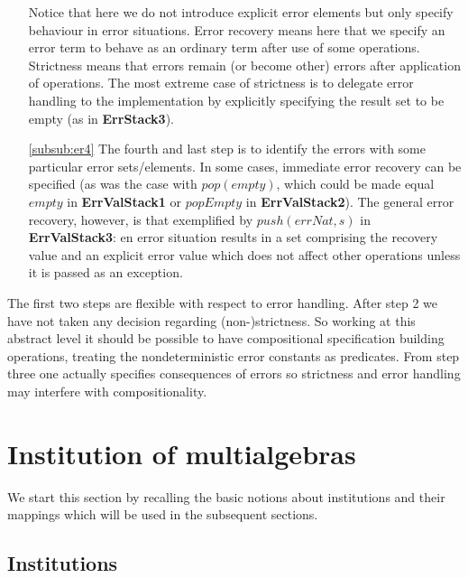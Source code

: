 \documentclass[10pt]{article}
\begin{document}
\begin{enumerate}
	Notice that here we do not introduce explicit error elements but only
	specify behaviour in error situations. Error recovery means here that we specify an error term to
	behave as an ordinary term after use of some operations. Strictness
	means that errors remain (or become other) errors after application of
	operations. The most extreme case of strictness is to delegate error
	handling to the implementation by explicitly specifying the result
	set to be empty (as in {\bf ErrStack3}).

\item[\ref{subsub:er4}] The fourth and last step is to identify the errors with some
	particular error sets/elements. 
In some cases,
immediate error recovery can be specified (as was the case with $pop(empty)$,
which could be made equal $empty$ in {\bf ErrValStack1} or $popEmpty$ in {\bf
ErrValStack2}). The general error recovery, however, is that exemplified by
$push(errNat,s)$ in {\bf ErrValStack3}: en error situation results in a set
comprising the recovery value and an explicit error value which does not
affect other operations unless it is passed as an exception.
\end{enumerate}
%
The first two steps are flexible with respect to error handling. After step 2 we
have not taken any decision regarding (non-)strictness. So working at this
abstract level it should be possible to have compositional specification
building operations, treating the nondeterministic error constants as
predicates. From step three one actually specifies consequences of errors so
strictness and error handling may interfere with compositionality.



\section{Institution of multialgebras}\label{se:inst}
We start this section by recalling the basic notions about institutions and
their mappings which will be used in the subsequent sections.
 
\subsection{Institutions}
\end{document}
